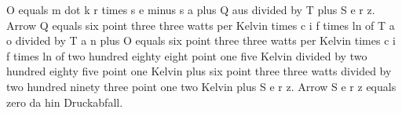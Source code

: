 O equals m dot k r times s e minus s a plus Q aus divided by T plus S e r z. Arrow Q equals six point three three watts per Kelvin times c i f times ln of T a o divided by T a n plus O equals six point three three watts per Kelvin times c i f times ln of two hundred eighty eight point one five Kelvin divided by two hundred eighty five point one Kelvin plus six point three three watts divided by two hundred ninety three point one two Kelvin plus S e r z. Arrow S e r z equals zero da hin Druckabfall.